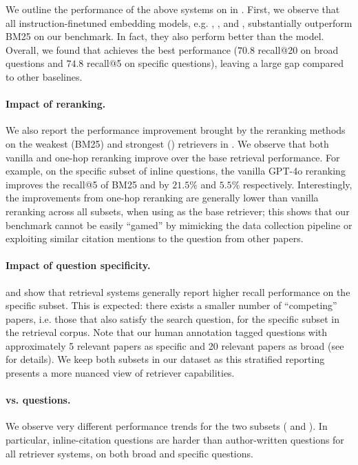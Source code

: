 We outline the performance of the above systems on \ours{} in . First, we observe that all instruction-finetuned embedding models, e.g.  \instructor{}, \efive{}, and \grit{}, substantially outperform BM25 on our benchmark. In fact, they also perform better than the \gtr{} model. Overall, we found that \gritfull{} achieves the best performance ($70.8$ recall@20 on broad questions and $74.8$ recall@5 on specific questions), leaving a large gap compared to other baselines. 

\paragraph{Impact of reranking.}
We also report the performance improvement brought by the reranking methods on the weakest (BM25) and strongest (\grit{}) retrievers  in . We observe that both vanilla and one-hop reranking improve over the base retrieval performance. For example, on the specific subset of inline questions, the vanilla GPT-4o reranking improves the recall@5 of BM25 and \grit{} by $21.5\%$
and $5.5\%$ respectively. 
Interestingly, the improvements from one-hop reranking are generally lower than vanilla reranking across all subsets, when using \grit{} as the base retriever; this shows that our benchmark  cannot be easily ``gamed'' by mimicking the data collection pipeline or exploiting similar citation mentions to the question from other papers.  

\paragraph{Impact of question specificity.}  and  show that retrieval systems generally report higher recall performance on the specific subset. This is expected: there exists a smaller number of ``competing'' papers, i.e. those that also satisfy the search question, for the specific subset in the retrieval corpus. 
Note that our human annotation tagged questions with approximately 5 relevant papers  as specific and 20 relevant papers as broad (see  for details). 
We keep both subsets in our dataset as this stratified reporting presents a more nuanced view of retriever capabilities. 

\paragraph{\inlineQ{} vs. \authorq{} questions.} 
We observe very different performance trends for the two subsets  ( and ). 
In particular, inline-citation questions are harder than author-written questions for all retriever systems, on both broad and specific questions.


